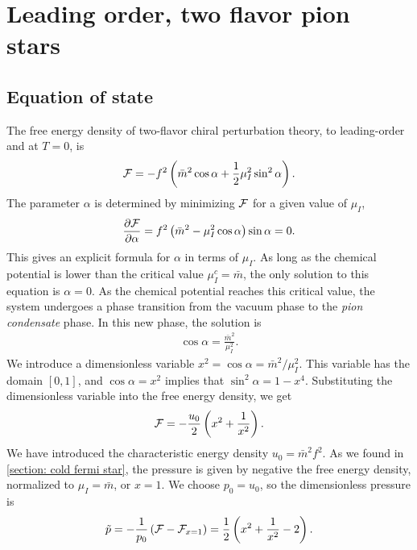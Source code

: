 \section{Leading order, two flavor pion stars}


\subsection{Equation of state}
 
The free energy density of two-flavor chiral perturbation theory, to leading-order and at $T = 0$, is
%
\begin{equation}
    \mathcal{F} = - f^2 \left(\bar m^2 \cos \alpha + \frac{1}{2} \mu_I^2 \sin^2 \alpha\right).
\end{equation}
%
The parameter $\alpha$ is determined by minimizing $\mathcal{F}$ for a given value of $\mu_I$,
%
\begin{equation}
    \pdv{\mathcal{F}}{\alpha} = f^2 \left(\bar m^2 - \mu_I^2 \cos \alpha\right) \sin\alpha = 0.
\end{equation}
%
This gives an explicit formula for $\alpha$ in terms of $\mu_I$.
As long as the chemical potential is lower than the critical value $\mu_I^c = \bar m$, the only solution to this equation is $\alpha = 0$.
As the chemical potential reaches this critical value, the system undergoes a phase transition from the vacuum phase to the \emph{pion condensate} phase.
In this new phase, the solution is
%
\begin{align}
    \label{alpha as function of mu lowest order}
    \cos \alpha = \frac{\bar m^2}{\mu_I^2}.
\end{align}
%
We introduce a dimensionless variable $x^2 = \cos\alpha = \bar m^2 / \mu_I^2$.
This variable has the domain $[0, 1]$, and $\cos \alpha = x^2$ implies that $\sin^2 \alpha = 1 - x^4$.
Substituting the dimensionless variable into the free energy density, we get 
%
\begin{equation}
    \mathcal{F} = - \frac{u_0}{2} \left( x^2 + \frac{1}{x^2} \right).
\end{equation}
%
We have introduced the characteristic energy density $u_0 = \bar m^2 f^2$.
As we found in \autoref{section: cold fermi star}, the pressure is given by negative the free energy density, normalized to $\mu_I = \bar m$, or $x = 1$.
We choose $p_0 = u_0$, so the dimensionless pressure is
%
\begin{equation}
    \label{pressure leading order chpt}
    \tilde p = -\frac{1}{p_0} \left(\mathcal{F} - \mathcal{F}_{x=1}\right) 
    = \frac{1}{2} \left( x^2 + \frac{1}{x^2} - 2 \right).
\end{equation}

